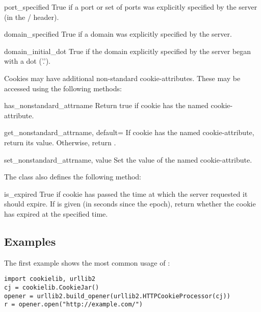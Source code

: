 \begin{memberdesc}[Cookie]{port_specified}
True if a port or set of ports was explicitly specified by the server
(in the  /  header).
\end{memberdesc}
\begin{memberdesc}[Cookie]{domain_specified}
True if a domain was explicitly specified by the server.
\end{memberdesc}
\begin{memberdesc}[Cookie]{domain_initial_dot}
True if the domain explicitly specified by the server began with a
dot ('.').
\end{memberdesc}

Cookies may have additional non-standard cookie-attributes.  These may
be accessed using the following methods:

\begin{methoddesc}[Cookie]{has_nonstandard_attr}{name}
Return true if cookie has the named cookie-attribute.
\end{methoddesc}
\begin{methoddesc}[Cookie]{get_nonstandard_attr}{name, default=}
If cookie has the named cookie-attribute, return its value.
Otherwise, return .
\end{methoddesc}
\begin{methoddesc}[Cookie]{set_nonstandard_attr}{name, value}
Set the value of the named cookie-attribute.
\end{methoddesc}

The  class also defines the following method:

\begin{methoddesc}[Cookie]{is_expired}{}
True if cookie has passed the time at which the server requested it
should expire.  If  is given (in seconds since the epoch),
return whether the cookie has expired at the specified time.
\end{methoddesc}


\subsection{Examples \label{cookielib-examples}}

The first example shows the most common usage of :

\begin{verbatim}
import cookielib, urllib2
cj = cookielib.CookieJar()
opener = urllib2.build_opener(urllib2.HTTPCookieProcessor(cj))
r = opener.open("http://example.com/")
\end{verbatim}

